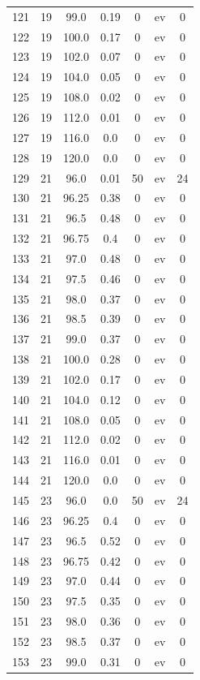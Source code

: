\documentclass[12pt,a4paper]{article}
\begin{document}
\begin{tabular}{r|cccccc}
	121 & 19 & 99.0 & 0.19 & 0 & ev & 0 \\
	122 & 19 & 100.0 & 0.17 & 0 & ev & 0 \\
	123 & 19 & 102.0 & 0.07 & 0 & ev & 0 \\
	124 & 19 & 104.0 & 0.05 & 0 & ev & 0 \\
	125 & 19 & 108.0 & 0.02 & 0 & ev & 0 \\
	126 & 19 & 112.0 & 0.01 & 0 & ev & 0 \\
	127 & 19 & 116.0 & 0.0 & 0 & ev & 0 \\
	128 & 19 & 120.0 & 0.0 & 0 & ev & 0 \\
	129 & 21 & 96.0 & 0.01 & 50 & ev & 24 \\
	130 & 21 & 96.25 & 0.38 & 0 & ev & 0 \\
	131 & 21 & 96.5 & 0.48 & 0 & ev & 0 \\
	132 & 21 & 96.75 & 0.4 & 0 & ev & 0 \\
	133 & 21 & 97.0 & 0.48 & 0 & ev & 0 \\
	134 & 21 & 97.5 & 0.46 & 0 & ev & 0 \\
	135 & 21 & 98.0 & 0.37 & 0 & ev & 0 \\
	136 & 21 & 98.5 & 0.39 & 0 & ev & 0 \\
	137 & 21 & 99.0 & 0.37 & 0 & ev & 0 \\
	138 & 21 & 100.0 & 0.28 & 0 & ev & 0 \\
	139 & 21 & 102.0 & 0.17 & 0 & ev & 0 \\
	140 & 21 & 104.0 & 0.12 & 0 & ev & 0 \\
	141 & 21 & 108.0 & 0.05 & 0 & ev & 0 \\
	142 & 21 & 112.0 & 0.02 & 0 & ev & 0 \\
	143 & 21 & 116.0 & 0.01 & 0 & ev & 0 \\
	144 & 21 & 120.0 & 0.0 & 0 & ev & 0 \\
	145 & 23 & 96.0 & 0.0 & 50 & ev & 24 \\
	146 & 23 & 96.25 & 0.4 & 0 & ev & 0 \\
	147 & 23 & 96.5 & 0.52 & 0 & ev & 0 \\
	148 & 23 & 96.75 & 0.42 & 0 & ev & 0 \\
	149 & 23 & 97.0 & 0.44 & 0 & ev & 0 \\
	150 & 23 & 97.5 & 0.35 & 0 & ev & 0 \\
	151 & 23 & 98.0 & 0.36 & 0 & ev & 0 \\
	152 & 23 & 98.5 & 0.37 & 0 & ev & 0 \\
	153 & 23 & 99.0 & 0.31 & 0 & ev & 0 \\

\end{tabular}
\end{document}
